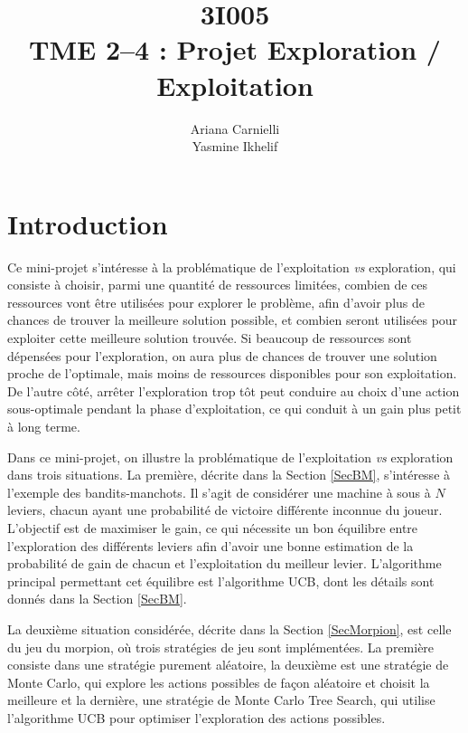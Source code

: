\documentclass[a4paper,12pt]{article}
\begin{document}
\pagestyle{plain}

\title{3I005 \\ TME 2--4 : Projet Exploration / Exploitation}
\author{Ariana Carnielli \\ Yasmine Ikhelif}
\date{}

\maketitle

\sloppy

\tableofcontents

\section{Introduction}

Ce mini-projet s'intéresse à la problématique de l'exploitation \emph{vs} exploration, qui consiste à choisir, parmi une quantité de ressources limitées, combien de ces ressources vont être utilisées pour explorer le problème, afin d'avoir plus de chances de trouver la meilleure solution possible, et combien seront utilisées pour exploiter cette meilleure solution trouvée. Si beaucoup de ressources sont dépensées pour l'exploration, on aura plus de chances de trouver une solution proche de l'optimale, mais moins de ressources disponibles pour son exploitation. De l'autre côté, arrêter l'exploration trop tôt peut conduire au choix d'une action sous-optimale pendant la phase d'exploitation, ce qui conduit à un gain plus petit à long terme.

Dans ce mini-projet, on illustre la problématique de l'exploitation \emph{vs} exploration dans trois situations. La première, décrite dans la Section \ref{SecBM}, s'intéresse à l'exemple des bandits-manchots. Il s'agit de considérer une machine à sous à $N$ leviers, chacun ayant une probabilité de victoire différente inconnue du joueur. L'objectif est de maximiser le gain, ce qui nécessite un bon équilibre entre l'exploration des différents leviers afin d'avoir une bonne estimation de la probabilité de gain de chacun et l'exploitation du meilleur levier. L'algorithme principal permettant cet équilibre est l'algorithme UCB, dont les détails sont donnés dans la Section \ref{SecBM}.

La deuxième situation considérée, décrite dans la Section \ref{SecMorpion}, est celle du jeu du morpion, où trois stratégies de jeu sont implémentées. La première consiste dans une stratégie purement aléatoire, la deuxième est une stratégie de Monte Carlo, qui explore les actions possibles de façon aléatoire et choisit la meilleure et la dernière, une stratégie de Monte Carlo Tree Search, qui utilise l'algorithme UCB pour optimiser l'exploration des actions possibles.
\end{document}
